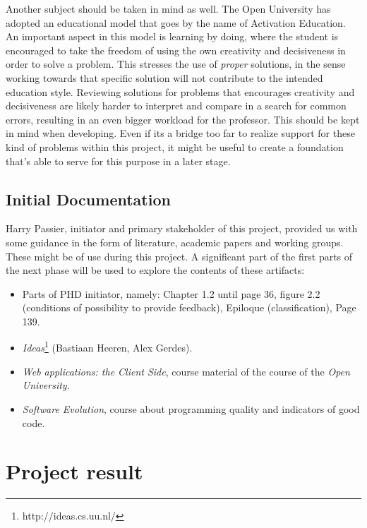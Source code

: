 \documentclass{article}
\begin{document}
Another subject should be taken in mind as well. The Open University has adopted 
an educational model that goes by the name of Activation Education. An important 
aspect in this model is learning by doing, where the student is encouraged to 
take the freedom of using the own creativity and decisiveness in order to solve 
a problem. This stresses the use of {\em proper} solutions, in the sense working 
towards that specific solution will not contribute to the intended education 
style. Reviewing solutions for problems that encourages creativity and 
decisiveness are likely harder to interpret and compare in a search for common 
errors, resulting in an even bigger workload for the professor. This should be 
kept in mind when developing. Even if its a bridge too far to realize support 
for these kind of problems within this project, it might be useful to create a 
foundation that's able to serve for this purpose in a later stage. 

\subsection{Initial Documentation}

Harry Passier, initiator and primary stakeholder of this project, provided us 
with some guidance in the form of literature, academic papers and working 
groups. These might be of use during this project. A significant part of the 
first parts of the next phase will be used to explore the contents of these 
artifacts: \begin{itemize} \item Parts of PHD initiator, namely: Chapter 1.2 
until page 36, figure 2.2 (conditions of possibility to provide feedback), 
Epiloque (classification), Page 139. \item {\em 
Ideas}\footnote{http://ideas.cs.uu.nl/} (Bastiaan Heeren, Alex Gerdes). \item 
{\em Web applications: the Client Side}, course material of the course of the 
{\em Open University}. \item {\em Software Evolution}, course about programming 
quality and indicators of good code. \end{itemize} 

\section{Project result}
\end{document}
